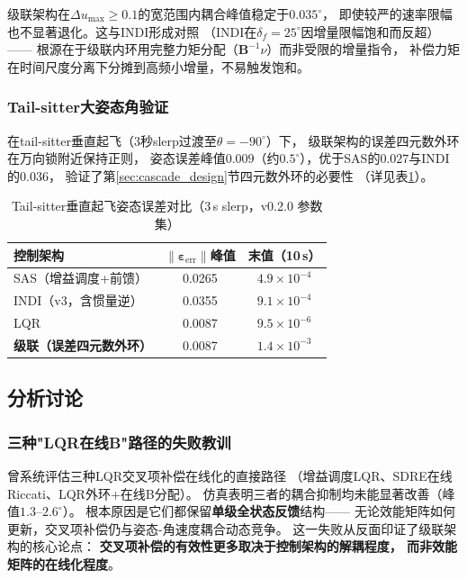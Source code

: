 级联架构在$\Delta u_{\max}\ge0.1$的宽范围内耦合峰值稳定于$0.035^\circ$，
即使较严的速率限幅也不显著退化。这与INDI形成对照
（INDI在$\delta_f=25^\circ$因增量限幅饱和而反超）——
根源在于级联内环用完整力矩分配（$\mathbf{B}^{-1}\nu$）而非受限的增量指令，
补偿力矩在时间尺度分离下分摊到高频小增量，不易触发饱和。

\subsubsection{Tail-sitter大姿态角验证}

在tail-sitter垂直起飞（3秒slerp过渡至$\theta=-90^\circ$）下，
级联架构的误差四元数外环在万向锁附近保持正则，
姿态误差峰值$0.009$（约$0.5^\circ$），优于SAS的$0.027$与INDI的$0.036$，
验证了第\ref{sec:cascade_design}节四元数外环的必要性
（详见表\ref{tab:cascade_ch_vtol2}）。

\begin{table}[H]
\centering
\caption{Tail-sitter垂直起飞姿态误差对比（3\,s slerp，v0.2.0 参数集）}
\label{tab:cascade_ch_vtol2}
\small
\begin{tabular}{l c c}
\toprule
\textbf{控制架构} & $\|\boldsymbol{\varepsilon}_{\mathrm{err}}\|$峰值 & 末值（10\,s） \\
\midrule
SAS（增益调度+前馈） & 0.0265 & $4.9\times10^{-4}$ \\
INDI（v3，含惯量逆） & 0.0355 & $9.1\times10^{-4}$ \\
LQR & 0.0087 & $9.5\times10^{-6}$ \\
\textbf{级联（误差四元数外环）} & 0.0087 & $1.4\times10^{-3}$ \\
\bottomrule
\end{tabular}
\end{table}

\subsection{分析讨论}
\label{sec:cascade_analysis}

\subsubsection{三种"LQR在线B"路径的失败教训}

曾系统评估三种LQR交叉项补偿在线化的直接路径
（增益调度LQR、SDRE在线Riccati、LQR外环+在线B分配）。
仿真表明三者的耦合抑制均未能显著改善（峰值$1.3$--$2.6^\circ$）。
根本原因是它们都保留\textbf{单级全状态反馈}结构——
无论效能矩阵如何更新，交叉项补偿仍与姿态-角速度耦合动态竞争。
这一失败从反面印证了级联架构的核心论点：
\textbf{交叉项补偿的有效性更多取决于控制架构的解耦程度，
而非效能矩阵的在线化程度}。


